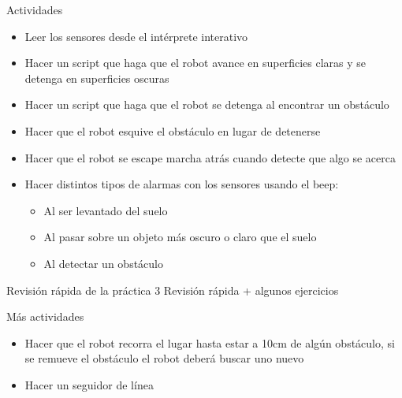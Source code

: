 \documentclass{beamer}[10]
\begin{document}
\begin{frame}{Actividades}
	\begin{itemize}[<+->]
		\item Leer los sensores desde el intérprete interativo
		\item Hacer un script que haga que el robot avance en superficies claras y se detenga en superficies oscuras
		\item Hacer un script que haga que el robot se detenga al encontrar un obstáculo
		\item Hacer que el robot esquive el obstáculo en lugar de detenerse
		\item Hacer que el robot se escape marcha atrás cuando detecte que algo se acerca
		\item Hacer distintos tipos de alarmas con los sensores usando el beep:
		\begin{itemize}
			\item Al ser levantado del suelo
			\item Al pasar sobre un objeto más oscuro o claro que el suelo
			\item Al detectar un obstáculo
		\end{itemize}
	\end{itemize}
\end{frame}
\begin{frame}{Revisión rápida de la práctica 3}
	Revisión rápida + algunos ejercicios
\end{frame}
\begin{frame}{Más actividades}
	\begin{itemize}
		\item Hacer que el robot recorra el lugar hasta estar a 10cm de algún obstáculo, si se remueve el obstáculo el robot deberá buscar uno nuevo
		\item Hacer un seguidor de línea
	\end{itemize}
\end{frame}
\end{document}
